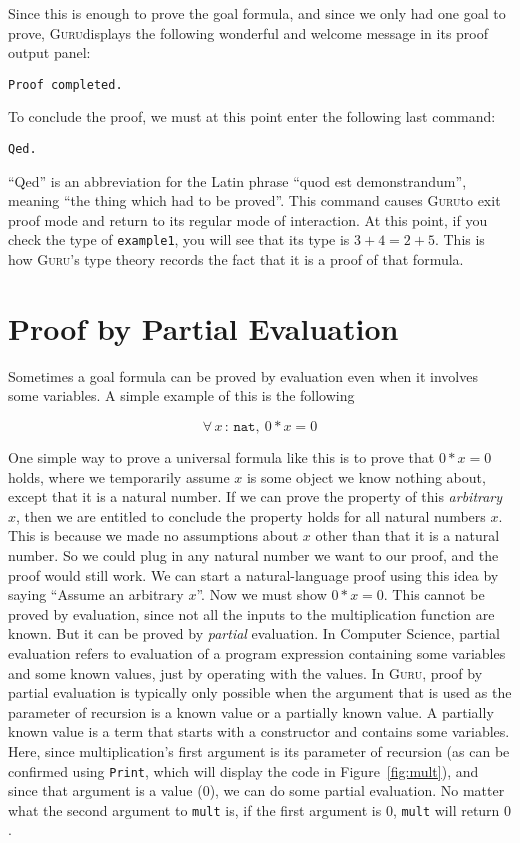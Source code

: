 \documentclass{book}[12pt]
\newcommand{\guru}[0]{\textsc{Guru}}
\begin{document}
\noindent Since this is enough to prove the goal formula, and since
we only had one goal to prove, \guru displays the following wonderful
and welcome message in its proof output panel:

\begin{verbatim}
Proof completed.
\end{verbatim}

\noindent To conclude the proof, we must at this point enter the
following last command:

\begin{verbatim}
Qed.
\end{verbatim}

\noindent ``Qed'' is an abbreviation for the Latin phrase ``quod est
demonstrandum'', meaning ``the thing which had to be proved''.  This
command causes \guru to exit proof mode and return to its regular mode
of interaction.  At this point, if you check the type of \texttt{example1},
you will see that its type is $3+4 = 2+5$.  This is how \guru's type theory
records the fact that it is a proof of that formula.

\section{Proof by Partial Evaluation}

Sometimes a goal formula can be proved by evaluation even when it involves
some variables.  A simple example of this is the following 

\[ \forall\, x\,:\,\texttt{nat},\ 0 * x = 0 \]

\noindent One simple way to prove a universal formula like this is to
prove that $0 * x = 0$ holds, where we temporarily assume $x$ is some
object we know nothing about, except that it is a natural number.  If
we can prove the property of this \emph{arbitrary} $x$, then we are
entitled to conclude the property holds for all natural numbers $x$.
This is because we made no assumptions about $x$ other than that it is
a natural number.  So we could plug in any natural number we want to
our proof, and the proof would still work.  We can start a
natural-language proof using this idea by saying ``Assume an arbitrary
$x$''.  Now we must show $0 * x = 0$.  This cannot be proved by
evaluation, since not all the inputs to the multiplication function
are known.  But it can be proved by \emph{partial} evaluation.  In
Computer Science, partial evaluation refers to evaluation of a program
expression containing some variables and some known values, just by
operating with the values.  In \guru, proof by partial evaluation is
typically only possible when the argument that is used as the
parameter of recursion is a known value or a partially known value.  A
partially known value is a term that starts with a constructor and
contains some variables.  Here, since multiplication's first argument
is its parameter of recursion (as can be confirmed using
\texttt{Print}, which will display the code in Figure~\ref{fig:mult}),
and since that argument is a value ($0$), we can do some partial
evaluation.  No matter what the second argument to \texttt{mult} is,
if the first argument is $0$, \texttt{mult} will return $0$.
\end{document}
